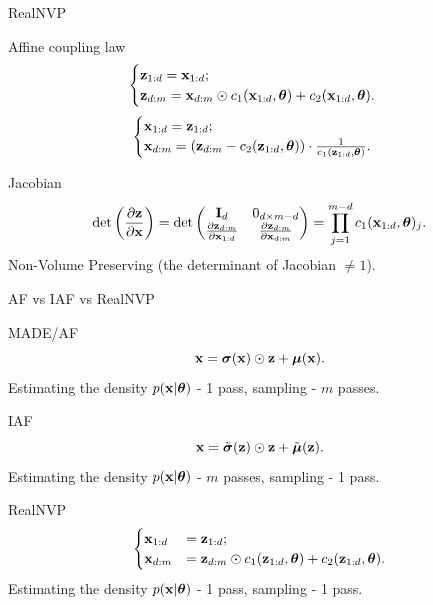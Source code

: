 \begin{frame}{RealNVP}
	\begin{block}{Affine coupling law}
		\[
			\begin{cases} \mathbf{z}_{1:d} = \mathbf{x}_{1:d}; \\ \mathbf{z}_{d:m} = \mathbf{x}_{d:m} \odot c_1(\mathbf{x}_{1:d}, \boldsymbol{\theta}) + c_2(\mathbf{x}_{1:d}, \boldsymbol{\theta}).\end{cases} 
		\]
		\[
			\begin{cases} \mathbf{x}_{1:d} = \mathbf{z}_{1:d}; \\ \mathbf{x}_{d:m} = \left(\mathbf{z}_{d:m} - c_2(\mathbf{z}_{1:d}, \boldsymbol{\theta}) \right) \cdot \frac{1}{c_1(\mathbf{z}_{1:d}, \boldsymbol{\theta})}.\end{cases}
		\]
	\end{block}
	\begin{block}{Jacobian}
		\vspace{-0.5cm}
		\[
		\det \left( \frac{\partial \mathbf{z}}{\partial \mathbf{x}} \right) = \det 
		\begin{pmatrix}
			\mathbf{I}_d & 0_{d \times m - d} \\
			\frac{\partial \mathbf{z}_{d:m}}{\partial \mathbf{x}_{1:d}} & \frac{\partial \mathbf{z}_{d:m}}{\partial \mathbf{x}_{d:m}}
		\end{pmatrix} = \prod_{j=1}^{m - d} c_1(\mathbf{x}_{1:d}, \boldsymbol{\theta})_j.
		\]
		Non-Volume Preserving (the determinant of Jacobian $\neq 1$).
	\end{block}
	
\end{frame}
\begin{frame}{AF vs IAF vs RealNVP}
	\begin{block}{MADE/AF}
		\vspace{-0.5cm}
		\[
		\mathbf{x} = \boldsymbol{\sigma} (\mathbf{x}) \odot \mathbf{z} + \boldsymbol{\mu}(\mathbf{x}).
		\]
		Estimating the density $p(\mathbf{x} | \boldsymbol{\theta})$ - 1 pass, sampling - $m$ passes.
	\end{block}
	\begin{block}{IAF}
		\vspace{-0.5cm}
		\[
		\mathbf{x} = \tilde{\boldsymbol{\sigma}} (\mathbf{z}) \odot \mathbf{z} + \tilde{\boldsymbol{\mu}}(\mathbf{z}).
		\]
		Estimating the density $p(\mathbf{x} | \boldsymbol{\theta})$ - $m$ passes, sampling - 1 pass.
	\end{block}
	\begin{block}{RealNVP}
		\vspace{-0.2cm}
		\[
			\begin{cases}
				\mathbf{x}_{1:d} &= \mathbf{z}_{1:d}; \\ 
				\mathbf{x}_{d:m} &= \mathbf{z}_{d:m} \odot c_1(\mathbf{z}_{1:d}, \boldsymbol{\theta}) + c_2(\mathbf{z}_{1:d}, \boldsymbol{\theta}).
			\end{cases}
		\]
		\vspace{-0.5cm}
		Estimating the density $p(\mathbf{x} | \boldsymbol{\theta})$ - 1 pass, sampling - 1 pass.
	\end{block}
\end{frame}
